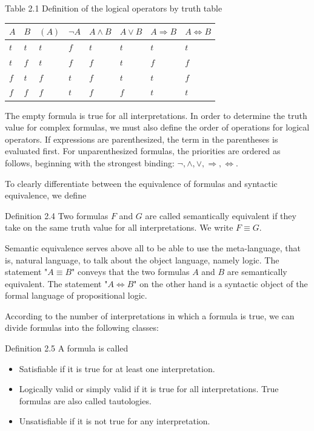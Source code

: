 \documentclass[10pt]{book}
\begin{document}
Table 2.1 Definition of the logical operators by truth table
\begin{center}
\begin{tabular}{llllllll}
\hline
$A$ & $B$ & $(A)$ & $\neg A$ & $A \wedge B$ & $A \vee B$ & $A \Rightarrow B$ & $A \Leftrightarrow B$ \\
\hline
$t$ & $t$ & $t$ & $f$ & $t$ & $t$ & $t$ & $t$ \\
\hline
$t$ & $f$ & $t$ & $f$ & $f$ & $t$ & $f$ & $f$ \\
\hline
$f$ & $t$ & $f$ & $t$ & $f$ & $t$ & $t$ & $f$ \\
\hline
$f$ & $f$ & $f$ & $t$ & $f$ & $f$ & $t$ & $t$ \\
\hline
\end{tabular}
\end{center}

The empty formula is true for all interpretations. In order to determine the truth value for complex formulas, we must also define the order of operations for logical operators. If expressions are parenthesized, the term in the parentheses is evaluated first. For unparenthesized formulas, the priorities are ordered as follows, beginning with the strongest binding: $\neg, \wedge, \vee, \Rightarrow, \Leftrightarrow$.

To clearly differentiate between the equivalence of formulas and syntactic equivalence, we define

Definition 2.4 Two formulas $F$ and $G$ are called semantically equivalent if they take on the same truth value for all interpretations. We write $F \equiv G$.

Semantic equivalence serves above all to be able to use the meta-language, that is, natural language, to talk about the object language, namely logic. The statement "$A \equiv B$" conveys that the two formulas $A$ and $B$ are semantically equivalent. The statement "$A \Leftrightarrow B$" on the other hand is a syntactic object of the formal language of propositional logic.

According to the number of interpretations in which a formula is true, we can divide formulas into the following classes:

Definition 2.5 A formula is called

\begin{itemize}
  \item Satisfiable if it is true for at least one interpretation.
  \item Logically valid or simply valid if it is true for all interpretations. True formulas are also called tautologies.
  \item Unsatisfiable if it is not true for any interpretation.
\end{itemize}
\end{document}
